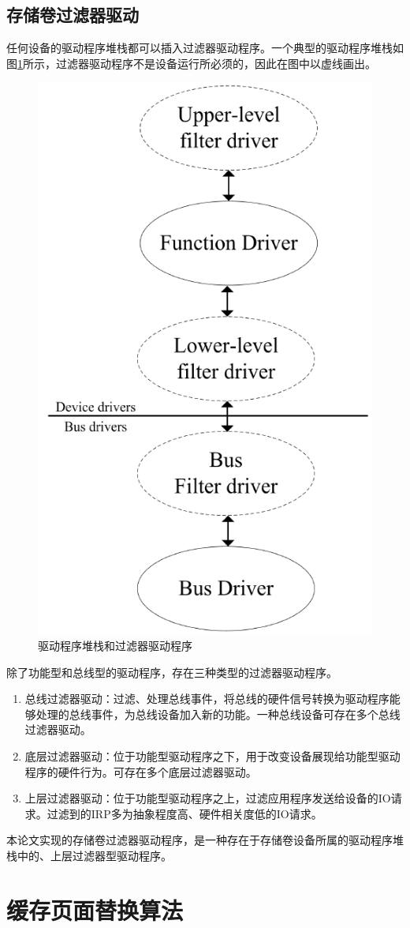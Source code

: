 \subsection{存储卷过滤器驱动}
任何设备的驱动程序堆栈都可以插入过滤器驱动程序。一个典型的驱动程序堆栈如图\ref{fig:io-stack-filter}所示，过滤器驱动程序不是设备运行所必须的，因此在图中以虚线画出。
\begin{figure}[htb]
\centering
\includegraphics[width=0.4\linewidth]{./graph/io-stack-filter}
\caption{驱动程序堆栈和过滤器驱动程序}
\label{fig:io-stack-filter}
\end{figure}
除了功能型和总线型的驱动程序，存在三种类型的过滤器驱动程序。
\begin{enumerate}
\item
总线过滤器驱动：过滤、处理总线事件，将总线的硬件信号转换为驱动程序能够处理的总线事件，为总线设备加入新的功能。一种总线设备可存在多个总线过滤器驱动。
\item
底层过滤器驱动：位于功能型驱动程序之下，用于改变设备展现给功能型驱动程序的硬件行为。可存在多个底层过滤器驱动。
\item
上层过滤器驱动：位于功能型驱动程序之上，过滤应用程序发送给设备的IO请求。过滤到的IRP多为抽象程度高、硬件相关度低的IO请求。
\end{enumerate}

本论文实现的存储卷过滤器驱动程序，是一种存在于存储卷设备所属的驱动程序堆栈中的、上层过滤器型驱动程序。

\section{缓存页面替换算法}
\label{sec:cache_algorithm}

